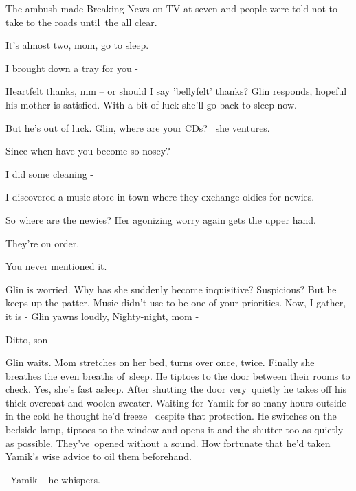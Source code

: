 \documentclass[letterpaper]{article}
\begin{document}
{\textquotedbl}The ambush made Breaking News on TV at seven and people were told not to take to the roads until~the all
clear.{\textquotedbl} 

{\textquotedbl}It's almost two, mom, go to sleep.{\textquotedbl} 

{\textquotedbl}I brought down a tray for you -{\textquotedbl} 

{\textquotedbl}Heartfelt thanks, mm -- or should I say 'bellyfelt' thanks?{\textquotedbl} Glin responds, hopeful his
mother is satisfied. With a bit of luck she'll go back to sleep now.

But he's out of luck. {\textquotedbl}Glin, where are your CDs?{\textquotedbl} \ she ventures.

{\textquotedbl}Since when have you become so nosey?{\textquotedbl} 

{\textquotedbl}I did some cleaning -{\textquotedbl} 

{\textquotedbl}I discovered a music store in town where they exchange oldies for newies.{\textquotedbl} 

{\textquotedbl}So where are the newies?{\textquotedbl} Her agonizing worry again gets the upper hand.

{\textquotedbl}They're on order.{\textquotedbl} 

{\textquotedbl}You never mentioned it.{\textquotedbl} 

Glin is worried. Why has she suddenly become inquisitive? Suspicious? But he keeps up the patter, {\textquotedbl}Music
didn't use to be one of your priorities. Now, I gather, it is -{\textquotedbl} Glin yawns
loudly\textcolor[rgb]{0.0,0.4392157,0.7529412}{,} {\textquotedbl}Nighty-night, mom -{\textquotedbl} 

{\textquotedbl}Ditto, son -{\textquotedbl}

Glin waits. Mom stretches on her bed, turns over once, twice. Finally she breathes the even breaths of~sleep. He tiptoes
to the door between their rooms to check. Yes, she's fast asleep. After shutting the door very~quietly he takes off his
thick overcoat and woolen sweater. Waiting for Yamik for so many hours outside in the cold he thought he'd freeze
\ despite that protection. He switches on the bedside lamp, tiptoes to the window and opens it and the shutter too as
quietly as possible. They've~opened without a sound. How fortunate that
h\textcolor[rgb]{0.0,0.4392157,0.7529412}{e}{}'d taken\textcolor[rgb]{0.0,0.4392157,0.7529412}{ }Yamik's wise advice to
oil them beforehand.

\ {\textquotedbl}Yamik --{\textquotedbl} he whispers.
\end{document}
